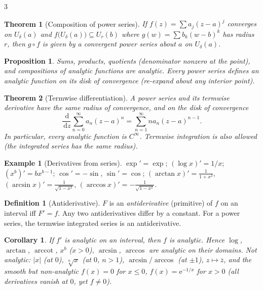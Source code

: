 \documentclass[10pt,a4paper,landscape]{article}
\theoremstyle{definition}
\newtheorem{defn}{Definition}[section]
\newtheorem{exm}{Example}[section]
\theoremstyle{plain}
\newtheorem{thm}{Theorem}[section]
\newtheorem{prop}{Proposition}[section]
\newtheorem{cor}{Corollary}[section]
\theoremstyle{remark}
\newcommand{\dd}{\,\mathrm{d}}
\newcommand{\e}{\mathrm{e}}
\newcommand{\abs}[1]{\lvert #1 \rvert}
\newcommand{\oo}{\infty}
\newcommand{\comp}{\circ}
\newcommand{\ball}[1]{U_{#1}}
\DeclareMathOperator{\arccot}{arccot}
\begin{document}
\begin{multicols*}{3}
\begin{thm}[Composition of power series]
If $f(z) = \sum a_j (z-a)^j$ converges on $\ball{\delta}(a)$ and $f\bigl(\ball{\delta}(a)\bigr) \subseteq \ball{r}(b)$ where $g(w) = \sum b_k (w-b)^k$ has radius $r$, then $g \comp f$ is given by a convergent power series about $a$ on $\ball{\delta}(a)$.
\end{thm}

\begin{prop}
Sums, products, quotients (denominator nonzero at the point), and compositions of analytic functions are analytic. Every power series defines an analytic function on its disk of convergence (re-expand about any interior point).
\end{prop}

\begin{thm}[Termwise differentiation]
A power series and its termwise derivative have the same radius of convergence, and on the disk of convergence
\[
\frac{\dd}{\dd z} \sum_{n=0}^{\oo} a_n (z-a)^n = \sum_{n=1}^{\oo} n a_n (z-a)^{n-1}.
\]
In particular, every analytic function is $C^{\oo}$. Termwise integration is also allowed (the integrated series has the same radius).
\end{thm}

\begin{exm}[Derivatives from series]
$\exp' = \exp$; $(\log x)' = 1/x$; $(x^b)' = b x^{b-1}$; $\cos' = -\sin$, $\sin' = \cos$; $(\arctan x)' = \frac{1}{1+x^2}$, $(\arcsin x)' = \frac{1}{\sqrt{1-x^2}}$, $(\arccos x)' = -\frac{1}{\sqrt{1-x^2}}$.
\end{exm}

\begin{defn}[Antiderivative]
$F$ is an \emph{antiderivative} (primitive) of $f$ on an interval iff $F' = f$. Any two antiderivatives differ by a constant. For a power series, the termwise integrated series is an antiderivative.
\end{defn}

\begin{cor}
If $f'$ is analytic on an interval, then $f$ is analytic. Hence $\log$, $\arctan$, $\arccot$, $x^b$ ($x>0$), $\arcsin$, $\arccos$ are analytic on their domains. Not analytic: $\abs{x}$ (at $0$), $\sqrt[n]{x}$ (at $0$, $n>1$), $\arcsin/\arccos$ (at $\pm 1$), $z \mapsto \overline{z}$, and the smooth but non-analytic $f(x) = 0$ for $x \le 0$, $f(x) = \e^{-1/x}$ for $x > 0$ (all derivatives vanish at $0$, yet $f \neq 0$).
\end{cor}


\end{multicols*}
\end{document}
